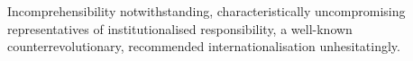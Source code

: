 Incomprehensibility notwithstanding, characteristically uncompromising
representatives of institutionalised responsibility, a well-known
counterrevolutionary, recommended internationalisation unhesitatingly.
